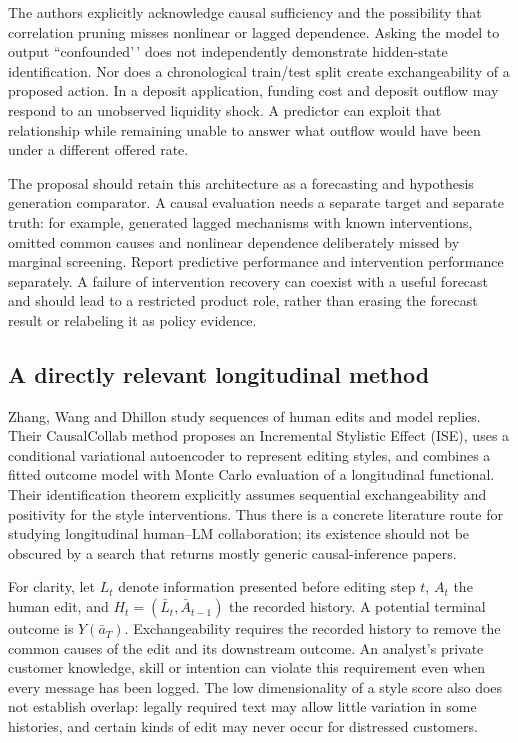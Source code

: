 The authors explicitly acknowledge causal sufficiency and the
possibility that correlation pruning misses nonlinear or lagged
dependence. Asking the model to output ``confounded'\,' does not
independently demonstrate hidden-state identification. Nor does a
chronological train/test split create exchangeability of a proposed
action. In a deposit application, funding cost and deposit outflow may
respond to an unobserved liquidity shock. A predictor can exploit that
relationship while remaining unable to answer what outflow would have
been under a different offered rate.

The proposal should retain this architecture as a forecasting and
hypothesis generation comparator. A causal evaluation needs a separate
target and separate truth: for example, generated lagged mechanisms with
known interventions, omitted common causes and nonlinear dependence
deliberately missed by marginal screening. Report predictive performance
and intervention performance separately. A failure of intervention
recovery can coexist with a useful forecast and should lead to a
restricted product role, rather than erasing the forecast result or
relabeling it as policy evidence.

\hypertarget{a-directly-relevant-longitudinal-method}{%
\subsection{A directly relevant longitudinal
method}\label{a-directly-relevant-longitudinal-method}}

Zhang, Wang and Dhillon study sequences of human edits and model
replies. Their CausalCollab method proposes an Incremental Stylistic
Effect (ISE), uses a conditional variational autoencoder to represent
editing styles, and combines a fitted outcome model with Monte Carlo
evaluation of a longitudinal functional. Their identification theorem
explicitly assumes sequential exchangeability and positivity for the
style interventions. Thus there is a concrete literature route for
studying longitudinal human--LM collaboration; its existence should not
be obscured by a search that returns mostly generic causal-inference
papers. \cite{exec13_census_collaboration}

For clarity, let \(L_t\) denote information presented before editing
step \(t\), \(A_t\) the human edit, and \(H_t=(\bar L_t,\bar A_{t-1})\)
the recorded history. A potential terminal outcome is \(Y(\bar a_T)\).
Exchangeability requires the recorded history to remove the common
causes of the edit and its downstream outcome. An analyst's private
customer knowledge, skill or intention can violate this requirement even
when every message has been logged. The low dimensionality of a style
score also does not establish overlap: legally required text may allow
little variation in some histories, and certain kinds of edit may never
occur for distressed customers.

